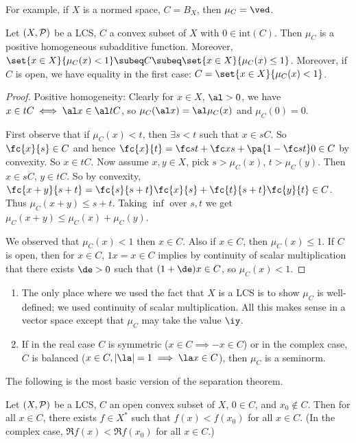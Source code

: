 For example, if $X$ is a normed space, $C=B_X$, then $\mu_C=\ved$. 
\begin{lem}
Let $(X,\cal P)$ be a LCS, $C$ a convex subset of $X$ with $0\in \text{int}(C)$. Then $\mu_C$ is a positive homogeneous subadditive function. Moreover, $\set{x\in X}{\mu_C(x)<1}\subeq C \subeq \set{x\in X}{\mu_C(x)\le 1}$.
Moreover, if $C$ is open, we have equality in the first case: $C=\set{x\in X}{\mu_C(x)<1}$.
\end{lem}
\begin{proof}
Positive homogeneity: Clearly for $x\in X$, $\al>0$, we have $x\in tC\iff\al x\in \al tC$, so $\mu_C(\al x)=\al \mu_C(x)$ and $\mu_C(0)=0$.

First observe that if $\mu_C(x)<t$, then $\exists s<t$ such that $x\in sC$. So $\fc{x}{s}\in C$ and hence $\fc{x}{t}=\fc st+\fc xs +\pa{1-\fc st}0\in C$ by convexity. So $x\in tC$. Now assume $x,y\in X$, pick $s>\mu_C(x)$, $t>\mu_C(y)$. Then $x\in sC$, $y\in tC$. So by convexity, $\fc{x+y}{s+t}=\fc{s}{s+t}\fc{x}{s}+\fc{t}{s+t}\fc{y}{t}\in C$. Thus $\mu_C(x+y)\le s+t$. Taking $\inf$ over $s,t$ we get $\mu_C(x+y)\le \mu_C(x)+\mu_C(y)$.

We observed that $\mu_C(x)<1$ then $x\in C$. Also if $x\in C$, then $\mu_C(x)\le 1$. If $C$ is open, then for $x\in C$, $1x=x\in C$ implies by continuity of scalar multiplication that there exists $\de>0$ such that $(1+\de)x\in C$, so $\mu_C(x)<1$.
\end{proof}


\begin{rem}
\begin{enumerate}
\item
The only place where we used the fact that $X$ is a LCS is to show $\mu_C$ is well-defined; we used continuity of scalar multiplication. All this makes sense in a vector space except that $\mu_C$ may take the value $\iy$.
\item
If in the real case $C$ is symmetric ($x\in C\implies -x\in C$) or in the complex case, $C$ is balanced ($x\in C,|\la|=1\implies \la x\in C$), then $\mu_C$ is a seminorm.
\end{enumerate}
\end{rem}

The following is the most basic version of the separation theorem.
\begin{thm}
Let $(X,\cal P)$ be a LCS, $C$ an open convex subset of $X$, $0\in C$, and $x_0\nin C$. Then for all $x\in C$, there exists $f\in X^*$ such that $f(x)<f(x_0)$ for all $x\in C$. (In the complex case, $\Re f(x)<\Re f(x_0)$ for all $x\in C$.)
\end{thm}

